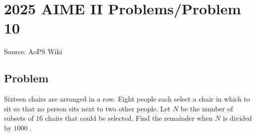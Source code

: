 \documentclass[12pt]{article}
\begin{document}
\section*{{2025 AIME II Problems/Problem 10}}
Source: AoPS Wiki

\subsection*{Problem}
Sixteen chairs are arranged in a row. Eight people each select a chair in which to sit so that no person sits next to two other people. Let $N$ be the number of subsets of $16$ chairs that could be selected. Find the remainder when $N$ is divided by $1000$ .
\end{document}
